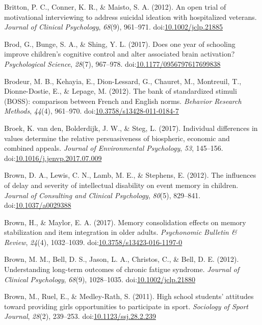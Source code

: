 \documentclass[english,man]{apa6}
\theoremstyle{definition}
\theoremstyle{definition}
\theoremstyle{definition}
\theoremstyle{remark}
\begin{document}
\hypertarget{ref-Britton2012}{}
Britton, P. C., Conner, K. R., \& Maisto, S. A. (2012). An open trial of
motivational interviewing to address suicidal ideation with hospitalized
veterans. \emph{Journal of Clinical Psychology}, \emph{68}(9), 961--971.
doi:\href{https://doi.org/10.1002/jclp.21885}{10.1002/jclp.21885}

\hypertarget{ref-Brod2017}{}
Brod, G., Bunge, S. A., \& Shing, Y. L. (2017). Does one year of
schooling improve children's cognitive control and alter associated
brain activation? \emph{Psychological Science}, \emph{28}(7), 967--978.
doi:\href{https://doi.org/10.1177/0956797617699838}{10.1177/0956797617699838}

\hypertarget{ref-Brodeur2012}{}
Brodeur, M. B., Kehayia, E., Dion-Lessard, G., Chauret, M., Montreuil,
T., Dionne-Dostie, E., \& Lepage, M. (2012). The bank of standardized
stimuli (BOSS): comparison between French and English norms.
\emph{Behavior Research Methods}, \emph{44}(4), 961--970.
doi:\href{https://doi.org/10.3758/s13428-011-0184-7}{10.3758/s13428-011-0184-7}

\hypertarget{ref-VandenBroek2017}{}
Broek, K. van den, Bolderdijk, J. W., \& Steg, L. (2017). Individual
differences in values determine the relative persuasiveness of
biospheric, economic and combined appeals. \emph{Journal of
Environmental Psychology}, \emph{53}, 145--156.
doi:\href{https://doi.org/10.1016/j.jenvp.2017.07.009}{10.1016/j.jenvp.2017.07.009}

\hypertarget{ref-Brown2012}{}
Brown, D. A., Lewis, C. N., Lamb, M. E., \& Stephens, E. (2012). The
influences of delay and severity of intellectual disability on event
memory in children. \emph{Journal of Consulting and Clinical
Psychology}, \emph{80}(5), 829--841.
doi:\href{https://doi.org/10.1037/a0029388}{10.1037/a0029388}

\hypertarget{ref-Brown2016}{}
Brown, H., \& Maylor, E. A. (2017). Memory consolidation effects on
memory stabilization and item integration in older adults.
\emph{Psychonomic Bulletin \& Review}, \emph{24}(4), 1032--1039.
doi:\href{https://doi.org/10.3758/s13423-016-1197-0}{10.3758/s13423-016-1197-0}

\hypertarget{ref-Brown2012a}{}
Brown, M. M., Bell, D. S., Jason, L. A., Christos, C., \& Bell, D. E.
(2012). Understanding long-term outcomes of chronic fatigue syndrome.
\emph{Journal of Clinical Psychology}, \emph{68}(9), 1028--1035.
doi:\href{https://doi.org/10.1002/jclp.21880}{10.1002/jclp.21880}

\hypertarget{ref-Brown2011}{}
Brown, M., Ruel, E., \& Medley-Rath, S. (2011). High school students'
attitudes toward providing girls opportunities to participate in sport.
\emph{Sociology of Sport Journal}, \emph{28}(2), 239--253.
doi:\href{https://doi.org/10.1123/ssj.28.2.239}{10.1123/ssj.28.2.239}
\end{document}
